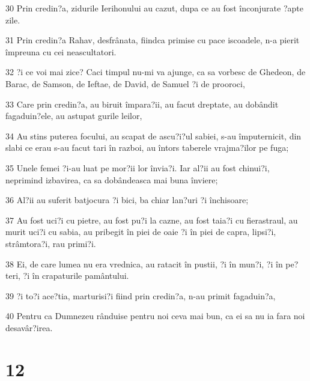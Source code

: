 \par 30 Prin credin?a, zidurile Ierihonului au cazut, dupa ce au fost înconjurate ?apte zile.
\par 31 Prin credin?a Rahav, desfrânata, fiindca primise cu pace iscoadele, n-a pierit împreuna cu cei neascultatori.
\par 32 ?i ce voi mai zice? Caci timpul nu-mi va ajunge, ca sa vorbesc de Ghedeon, de Barac, de Samson, de Ieftae, de David, de Samuel ?i de prooroci,
\par 33 Care prin credin?a, au biruit împara?ii, au facut dreptate, au dobândit fagaduin?ele, au astupat gurile leilor,
\par 34 Au stins puterea focului, au scapat de ascu?i?ul sabiei, s-au împuternicit, din slabi ce erau s-au facut tari în razboi, au întors taberele vrajma?ilor pe fuga;
\par 35 Unele femei ?i-au luat pe mor?ii lor învia?i. Iar al?ii au fost chinui?i, neprimind izbavirea, ca sa dobândeasca mai buna înviere;
\par 36 Al?ii au suferit batjocura ?i bici, ba chiar lan?uri ?i închisoare;
\par 37 Au fost uci?i cu pietre, au fost pu?i la cazne, au fost taia?i cu fierastraul, au murit uci?i cu sabia, au pribegit în piei de oaie ?i în piei de capra, lipsi?i, strâmtora?i, rau primi?i.
\par 38 Ei, de care lumea nu era vrednica, au ratacit în pustii, ?i în mun?i, ?i în pe?teri, ?i în crapaturile pamântului.
\par 39 ?i to?i ace?tia, marturisi?i fiind prin credin?a, n-au primit fagaduin?a,
\par 40 Pentru ca Dumnezeu rânduise pentru noi ceva mai bun, ca ei sa nu ia fara noi desavâr?irea.

\chapter{12}

